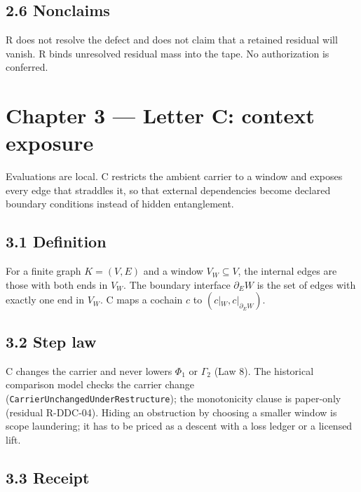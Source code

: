 \documentclass[
  11pt,
]{article}
\newenvironment{Shaded}{}{}
\newcommand{\NormalTok}[1]{#1}
\renewcommand{\_}{\ddcunderscore\allowbreak}
\begin{document}
\subsection{2.6 Nonclaims}\label{nonclaims-1}

\begin{Shaded}
\begin{Highlighting}[]
\NormalTok{R does not resolve the defect and does not claim that a retained residual will vanish.}
\NormalTok{R binds unresolved residual mass into the tape. No authorization is conferred.}
\end{Highlighting}
\end{Shaded}

\section{Chapter 3 --- Letter C: context exposure}\label{chapter-3}

Evaluations are local. C restricts the ambient carrier to a window and
exposes every edge that straddles it, so that external dependencies
become declared boundary conditions instead of hidden entanglement.

\subsection{3.1 Definition}\label{definition-3}

For a finite graph \(K = (V, E)\) and a window \(V_W \subseteq V\), the
internal edges are those with both ends in \(V_W\). The boundary
interface \(\partial_E W\) is the set of edges with exactly one end in
\(V_W\). C maps a cochain \(c\) to \((c|_W, c|_{\partial_E W})\).

\subsection{3.2 Step law}\label{step-law-2}

C changes the carrier and never lowers \(\Phi_1\) or \(\Gamma_2\) (Law
8). The historical comparison model checks the carrier change
(\texttt{Carrier\allowbreak Unchanged\allowbreak Under\allowbreak Restructure}); the monotonicity clause is
paper-only (residual R-DDC-04). Hiding an obstruction by choosing a
smaller window is scope laundering; it has to be priced as a descent
with a loss ledger or a licensed lift.

\subsection{3.3 Receipt}\label{receipt-2}
\end{document}
